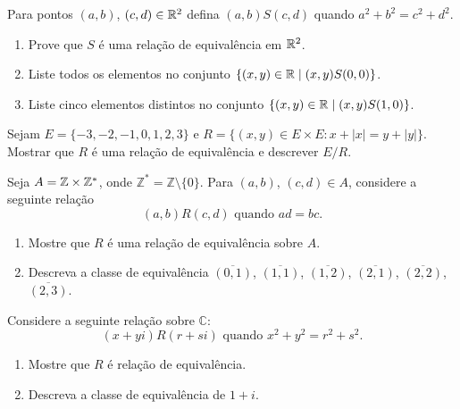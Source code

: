\documentclass[12pt]{exam}
\begin{document}
\vspace{.3cm}

\questao Para pontos $(a, b)$, $(c, d) \in \mathbb{R}^2$ defina $(a, b) S (c, d)$ quando $a^2 + b^2 = c^2 + d^2$.
\begin{enumerate}[label={\alph*})]
  \item Prove que $S$ \'e uma rela\c{c}\~ao de equival\^encia em $\mathbb{R}^2$.
  \item Liste todos os elementos no conjunto $\{(x, y) \in \mathbb{R} \mid (x, y) S (0, 0)\}$.
  \item Liste cinco elementos distintos no conjunto $\{(x, y) \in \mathbb{R} \mid (x, y) S (1, 0)\}$.
\end{enumerate}

\vspace{.3cm}

\questao Sejam $E = \{-3, -2, -1, 0, 1, 2, 3\}$ e $R = \{(x, y) \in E \times E : x + |x| = y + |y|\}$. Mostrar que $R$ \'e uma rela\c{c}\~ao de equival\^encia e descrever $E/R$.

\vspace{.3cm}

\questao Seja $A = \mathbb{Z} \times \mathbb{Z}^*$, onde $\mathbb{Z}^* = \mathbb{Z} \setminus \{0\}$. Para $(a,b)$, $(c,d) \in A$, considere a seguinte rela{\c c}{\~a}o
\[
    (a,b) R (c,d) \mbox{ quando } ad = bc.
\]
\begin{enumerate}[label={\alph*})]
    \item Mostre que $R$ {\'e} uma rela{\c c}{\~a}o de equival{\^e}ncia sobre $A$.
    \item Descreva a classe de equival{\^e}ncia $\overline{(0,1)}$, $\overline{(1,1)}$, $\overline{(1,2)}$, $\overline{(2,1)}$, $\overline{(2,2)}$, $\overline{(2,3)}$.
\end{enumerate}

\vspace{.3cm}



\vspace{.3cm}

\questao Considere a seguinte rela{\c c}{\~a}o sobre $\mathbb{C}$:
\[
    (x+yi) R (r+si) \mbox{ quando } x^2+y^2=r^2+s^2.
\]
\begin{enumerate}[label={\alph*})]
    \item Mostre que $R$ {\'e} rela{\c c}{\~a}o de equival{\^e}ncia.
    \item Descreva a classe de equival{\^e}ncia de $1+i$.
\end{enumerate}
\end{document}
